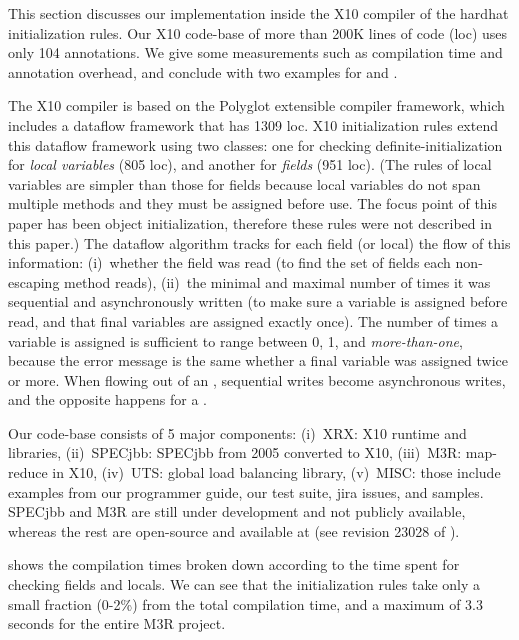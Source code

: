 This section discusses our implementation inside the X10 compiler of the hardhat initialization rules.
Our X10 code-base of more than 200K lines of code (loc) uses only 104 annotations.
We give some measurements such as compilation time and annotation overhead,
	and conclude with two examples for  and .
	
The X10 compiler is based on the Polyglot extensible compiler framework,
	which includes a dataflow framework that has 1309 loc. %
X10 initialization rules extend this dataflow framework
	using two classes:
	one for checking definite-initialization for \emph{local variables} (805 loc), %
	and another for \emph{fields} (951 loc). %
(The rules of local variables are simpler than those for fields
	because local variables do not span multiple methods 
	and they must be assigned before use.
	The focus point of this paper has been object initialization,
		therefore these rules 
		were not described in this paper.)
The dataflow algorithm tracks for each field (or local)
	the flow of this information:
	(i)~whether the field was read (to find the set of fields each non-escaping method {reads}),
	(ii)~the minimal and maximal number of times it was sequential and asynchronously written %
	(to make sure a variable is assigned before read, and that final variables are assigned exactly once).
The number of times a variable is assigned is sufficient to range between 0, 1, 
	and \emph{more-than-one}, 
	because the error message is the same whether a final variable
	was assigned twice or more.
When flowing out of an , sequential writes become asynchronous writes,
	and the opposite happens for a .

Our code-base consists of 5 major components:
	(i)~XRX: X10 runtime and libraries,
	(ii)~SPECjbb: SPECjbb from 2005 converted to X10,
	(iii)~M3R: map-reduce in X10,
	(iv)~UTS: global load balancing library,
	(v)~MISC: those include examples from our programmer guide, our test suite, jira issues, and samples.
SPECjbb and M3R are still under development and not publicly available,
	whereas the rest are open-source and available at 
	(see revision 23028 of ).


 shows the compilation times broken down according to the time spent 
	for checking fields and locals.
We can see that the initialization rules take only a small fraction (0-2\%) 
	from the total compilation time, and a maximum of 3.3 seconds for the entire M3R project.

